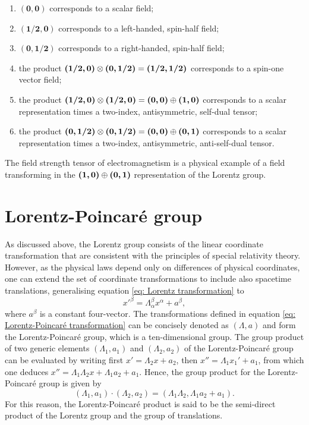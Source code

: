 \begin{enumerate}
    \item $\bm{(0,0)}$ corresponds to a scalar field;
    \item $\bm{(1/2,0)}$ corresponds to a left-handed, spin-half field;
    \item $\bm{(0,1/2)}$ corresponds to a right-handed, spin-half field;
    \item the product $\bm{(1/2,0)} \otimes \bm{(0,1/2)} = \bm{(1/2,1/2)}$ corresponds to a spin-one vector field;
    \item the product $\bm{(1/2,0)} \otimes \bm{(1/2,0)} = \bm{(0,0)} \oplus \bm{(1,0)}$ corresponds to a scalar representation times a two-index, antisymmetric, self-dual tensor;
    \item the product $\bm{(0,1/2)} \otimes \bm{(0,1/2)} = \bm{(0,0)} \oplus \bm{(0,1)}$ corresponds to a scalar representation times a two-index, antisymmetric, anti-self-dual tensor.
\end{enumerate}
\begin{obs}
    The field strength tensor of electromagnetism is a physical example of a field transforming in the $\bm{(1,0)} \oplus \bm{(0,1)}$ representation of the Lorentz group.
\end{obs}

\section{Lorentz-Poincaré group}
As discussed above, the Lorentz group consists of the linear coordinate transformation that are consistent with the principles of special relativity theory. However, as the physical laws depend only on differences of physical coordinates, one can extend the set of coordinate transformations to include also spacetime translations, generalising equation \eqref{eq: Lorentz transformation} to
\begin{equation}
\label{eq: Lorentz-Poincaré transformation}
    x'^\beta = \Lambda^\beta_\alpha x^\alpha + a^\beta,
\end{equation}
where $a^\beta$ is a constant four-vector. The transformations defined in equation \eqref{eq: Lorentz-Poincaré transformation} can be concisely denoted as $(\Lambda,a)$ and form the Lorentz-Poincaré group, which is a ten-dimensional group. The group product of two generic elements $(\Lambda_1,a_1)$ and $(\Lambda_2,a_2)$ of the Lorentz-Poincaré group can be evaluated by writing first $x' = \Lambda_2x + a_2$, then $x'' = \Lambda_1x_1' + a_1$, from which one deduces $x'' = \Lambda_1\Lambda_2x + \Lambda_1a_2 + a_1$. Hence, the group product for the Lorentz-Poincaré group is given by
\begin{equation}
    (\Lambda_1,a_1) \cdot (\Lambda_2,a_2) = (\Lambda_1\Lambda_2, \Lambda_1a_2 + a_1).
\end{equation}
For this reason, the Lorentz-Poincaré product is said to be the semi-direct product of the Lorentz group and the group of translations. 

